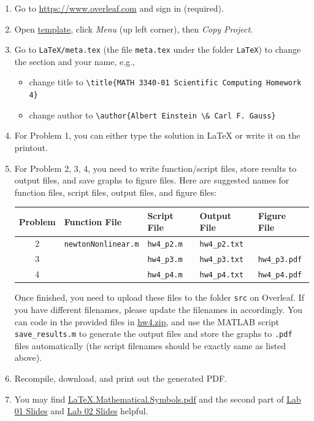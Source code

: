 \begin{enumerate}[label={\arabic*.}]
  \item Go to \url{https://www.overleaf.com} and sign in (required).
  \item Open \href{https://www.overleaf.com/read/rqdhjmcwvxgz}{template}, click \emph{Menu} (up left corner), then \emph{Copy Project}.
  \item Go to \verb|LaTeX/meta.tex| (the file \verb|meta.tex| under the folder \verb|LaTeX|) to change the section and your name, e.g.,
    \begin{itemize}
      \item change title to \verb|\title{MATH 3340-01 Scientific Computing Homework 4}|
      \item change author to \verb|\author{Albert Einstein \& Carl F. Gauss}|
    \end{itemize}
  \item For Problem 1, you can either type the solution in \LaTeX{} or write it on the printout.
  \item For Problem 2, 3, 4, you need to write function/script files, store results to output files, and save graphs to figure files. Here are suggested names for function files, script files, output files, and figure files:
    \begin{table}[!hbtp]
      \centering
      \begin{tabular}{cllll}
        \toprule
        Problem & Function File            & Script File     & Output File       & Figure File \\
        \midrule
        2       & \verb|newtonNonlinear.m| & \verb|hw4_p2.m| & \verb|hw4_p2.txt| &                   \\
        3       &                          & \verb|hw4_p3.m| & \verb|hw4_p3.txt| & \verb|hw4_p3.pdf| \\
        4       &                          & \verb|hw4_p4.m| & \verb|hw4_p4.txt| & \verb|hw4_p4.pdf| \\
        \bottomrule
      \end{tabular}
    \end{table}

    Once finished, you need to upload these files to the folder \verb|src| on Overleaf. If you have different filenames, please update the filenames in \verb|| accordingly. You can code in the provided files in \href{https://libaoj.in/courses/2021s/MATH3340/Homework/4/hw4.zip}{hw4.zip}, and use the MATLAB script \verb|save_results.m| to generate the output files and store the graphs to \verb|.pdf| files automatically (the script filenames should be exactly same as listed above).
  \item Recompile, download, and print out the generated PDF.
  \item You may find \href{https://libaoj.in/files/LaTeX.Mathematical.Symbols.pdf}{\LaTeX{}.Mathematical.Symbols.pdf} and the second part of \href{https://libaoj.in/courses/2021s/MATH3341/slides/Math.3341.Lab.01.Slides.pdf}{Lab 01 Slides} and \href{https://libaoj.in/courses/2021s/MATH3341/slides/Math.3341.Lab.02.Slides.pdf}{Lab 02 Slides} helpful.
\end{enumerate}
